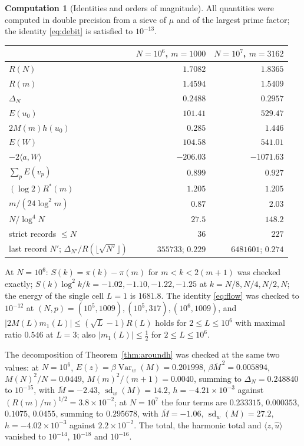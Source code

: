 \documentclass[11pt]{article}
\theoremstyle{definition}
\newtheorem{computation}[theorem]{Computation}
\theoremstyle{remark}
\newcommand{\ip}[2]{\langle #1,#2\rangle}
\newcommand{\Rstar}{R^{*}}
\begin{document}
\begin{computation}[Identities and orders of magnitude]
All quantities were computed in double precision from a sieve of $\mu$ and of the largest prime factor; the identity \eqref{eq:debit} is satisfied to $10^{-13}$.
\begin{center}
\begin{tabular}{lrr}
\toprule
 & $N=10^6$, $m=1000$ & $N=10^7$, $m=3162$\\
\midrule
$R(N)$ & $1.7082$ & $1.8365$\\
$R(m)$ & $1.4594$ & $1.5409$\\
$\Delta_N$ & $0.2488$ & $0.2957$\\
$E(u_0)$ & $101.41$ & $529.47$\\
$2M(m)h(u_0)$ & $0.285$ & $1.446$\\
$E(W)$ & $104.58$ & $541.01$\\
$-2\ip aW$ & $-206.03$ & $-1071.63$\\
$\sum_pE(v_p)$ & $0.899$ & $0.927$\\
$(\log2)\Rstar(m)$ & $1.205$ & $1.205$\\
$m/(24\log^2m)$ & $0.87$ & $2.03$\\
$N/\log^4N$ & $27.5$ & $148.2$\\
strict records $\le N$ & $36$ & $227$\\
last record $N'$; $\Delta_{N'}/R(\lfloor\sqrt{N'}\rfloor)$ & $355733$; $0.229$ & $6481601$; $0.274$\\
\bottomrule
\end{tabular}
\end{center}
At $N=10^6$: $S(k)=\pi(k)-\pi(m)$ for $m<k<2(m+1)$ was checked exactly; $S(k)\log^2k/k=-1.02,-1.10,-1.22,-1.25$ at $k=N/8,N/4,N/2,N$; the energy of the single cell $L=1$ is $1681.8$. The identity \eqref{eq:flow} was checked to $10^{-12}$ at $(N,p)=(10^5,1009),(10^5,317),(10^6,1009)$, and $|2M(L)m_1(L)|\le(\sqrt L-1)R(L)$ holds for $2\le L\le10^6$ with maximal ratio $0.546$ at $L=3$; also $|m_1(L)|\le\tfrac12$ for $2\le L\le10^6$.

The decomposition of Theorem~\ref{thm:aroundh} was checked at the same two values: at $N=10^6$, $E(z)=\beta\operatorname{Var}_w(M)=0.201998$, $\beta\overline M^{\,2}=0.005894$, $M(N)^2/N=0.0449$, $M(m)^2/(m+1)=0.0040$, summing to $\Delta_N=0.248840$ to $10^{-15}$, with $\overline M=-2.43$, $\operatorname{sd}_w(M)=14.2$, $h=-4.21\times10^{-3}$ against $(R(m)/m)^{1/2}=3.8\times10^{-2}$; at $N=10^7$ the four terms are $0.233315$, $0.000353$, $0.1075$, $0.0455$, summing to $0.295678$, with $\overline M=-1.06$, $\operatorname{sd}_w(M)=27.2$, $h=-4.02\times10^{-3}$ against $2.2\times10^{-2}$. The total, the harmonic total and $\ip z{\hat u}$ vanished to $10^{-14}$, $10^{-18}$ and $10^{-16}$.
\end{computation}
\end{document}
